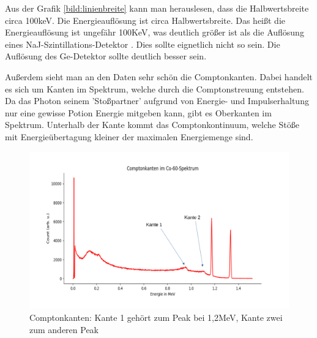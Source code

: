 Aus der Grafik \ref{bild:linienbreite} kann man herauslesen, dass die Halbwertsbreite circa 100keV. Die Energieauflösung ist circa Halbwertsbreite. Das heißt 
die Energieauflösung ist ungefähr 100KeV, was deutlich größer ist als die Auflösung eines NaJ-Szintillations-Detektor \cite[S.9]{Kador2021}. Dies sollte eignetlich nicht so sein.
Die Auflösung des Ge-Detektor sollte deutlich besser sein.  

Außerdem sieht man an den Daten sehr schön die Comptonkanten. Dabei handelt es sich um Kanten im Spektrum, welche durch die Comptonstreuung entstehen. 
Da das Photon seinem 'Stoßpartner' aufgrund von Energie- und Impulserhaltung nur eine gewisse Potion Energie mitgeben kann, gibt es Oberkanten im 
Spektrum. Unterhalb der Kante kommt das Comptonkontinuum, welche Stöße mit Energieübertagung kleiner der maximalen Energiemenge sind.


\begin{figure}[ht]
    \centering
    \includegraphics[width = \linewidth]{Bilder/Auswertung/Comtonkante.png}
    \caption{Comptonkanten: Kante 1 gehört zum Peak bei 1,2MeV, Kante zwei zum anderen Peak}
\end{figure}

\clearpage
